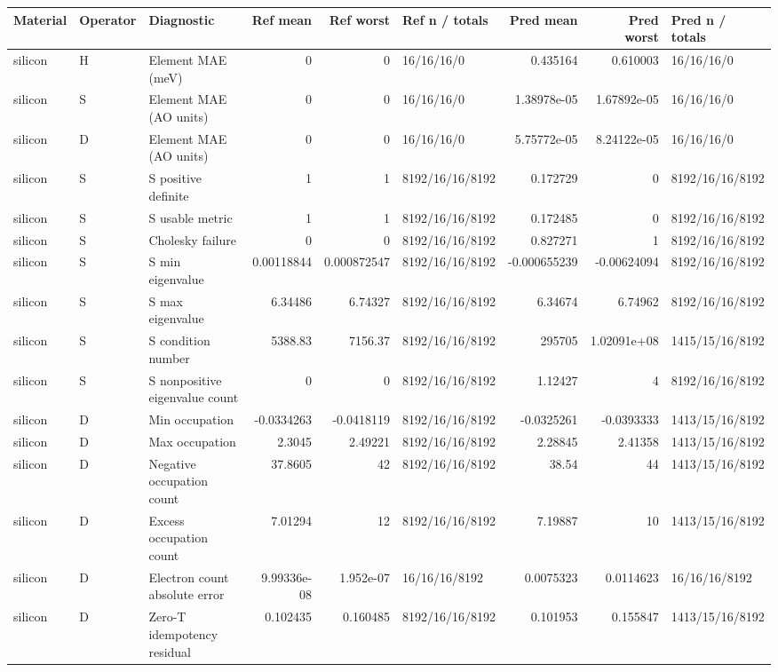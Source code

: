 \begin{tabular}{lllrrlrrl}
\toprule
Material & Operator & Diagnostic & Ref mean & Ref worst & Ref n / totals & Pred mean & Pred worst & Pred n / totals \\
\midrule
silicon & H & Element MAE (meV) & 0 & 0 & 16/16/16/0 & 0.435164 & 0.610003 & 16/16/16/0 \\
silicon & S & Element MAE (AO units) & 0 & 0 & 16/16/16/0 & 1.38978e-05 & 1.67892e-05 & 16/16/16/0 \\
silicon & D & Element MAE (AO units) & 0 & 0 & 16/16/16/0 & 5.75772e-05 & 8.24122e-05 & 16/16/16/0 \\
silicon & S & S positive definite & 1 & 1 & 8192/16/16/8192 & 0.172729 & 0 & 8192/16/16/8192 \\
silicon & S & S usable metric & 1 & 1 & 8192/16/16/8192 & 0.172485 & 0 & 8192/16/16/8192 \\
silicon & S & Cholesky failure & 0 & 0 & 8192/16/16/8192 & 0.827271 & 1 & 8192/16/16/8192 \\
silicon & S & S min eigenvalue & 0.00118844 & 0.000872547 & 8192/16/16/8192 & -0.000655239 & -0.00624094 & 8192/16/16/8192 \\
silicon & S & S max eigenvalue & 6.34486 & 6.74327 & 8192/16/16/8192 & 6.34674 & 6.74962 & 8192/16/16/8192 \\
silicon & S & S condition number & 5388.83 & 7156.37 & 8192/16/16/8192 & 295705 & 1.02091e+08 & 1415/15/16/8192 \\
silicon & S & S nonpositive eigenvalue count & 0 & 0 & 8192/16/16/8192 & 1.12427 & 4 & 8192/16/16/8192 \\
silicon & D & Min occupation & -0.0334263 & -0.0418119 & 8192/16/16/8192 & -0.0325261 & -0.0393333 & 1413/15/16/8192 \\
silicon & D & Max occupation & 2.3045 & 2.49221 & 8192/16/16/8192 & 2.28845 & 2.41358 & 1413/15/16/8192 \\
silicon & D & Negative occupation count & 37.8605 & 42 & 8192/16/16/8192 & 38.54 & 44 & 1413/15/16/8192 \\
silicon & D & Excess occupation count & 7.01294 & 12 & 8192/16/16/8192 & 7.19887 & 10 & 1413/15/16/8192 \\
silicon & D & Electron count absolute error & 9.99336e-08 & 1.952e-07 & 16/16/16/8192 & 0.0075323 & 0.0114623 & 16/16/16/8192 \\
silicon & D & Zero-T idempotency residual & 0.102435 & 0.160485 & 8192/16/16/8192 & 0.101953 & 0.155847 & 1413/15/16/8192 \\

\end{tabular}
